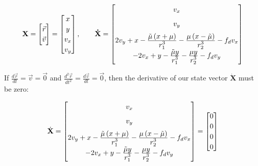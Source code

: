 \documentclass{article}
\newcommand{\deriv}[2]{\frac{d#1}{d#2}}
\newcommand{\ddfrac}[2]{\frac{\displaystyle #1}{\displaystyle #2}}
\begin{document}
\begin{equation*}
    \bf{X}
    = \begin{bmatrix}
        \vec{r} \\
        \vec{v}
    \end{bmatrix}
    = \begin{bmatrix}
        x   \\
        y   \\
        v_x \\
        v_y
    \end{bmatrix},
    \qquad \dot{\bf{X}} =
    \begin{bmatrix}
        v_x                                                                                                                  \\[0.2cm]
        v_y                                                                                                                  \\[0.2cm]
        2v_y + x - \ddfrac{\tilde{\mu} \left(x+\mu\right)}{r_1^3} - \ddfrac{\mu \left(x-\tilde{\mu}\right)}{r_2^3} - f_d v_x \\[0.2cm]
        -2v_x + y - \ddfrac{\tilde{\mu}y}{r_1^3} - \ddfrac{\mu y}{r_2^3} - f_d v_y
    \end{bmatrix}
\end{equation*}

If $\displaystyle \deriv{\vec{r}}{t} = \vec{v} = \vec{0}$ and $\displaystyle \deriv{^2\vec{r}}{t^2} = \deriv{\vec{v}}{t} = \vec{0}$, then the derivative of our state vector $\dot{\textbf{X}}$ must be zero:

\begin{equation*}
    \dot{\bf{X}} =
    \begin{bmatrix}
        v_x                                                                                                                  \\[0.2cm]
        v_y                                                                                                                  \\[0.2cm]
        2v_y + x - \ddfrac{\tilde{\mu} \left(x+\mu\right)}{r_1^3} - \ddfrac{\mu \left(x-\tilde{\mu}\right)}{r_2^3} - f_d v_x \\[0.2cm]
        -2v_x + y - \ddfrac{\tilde{\mu}y}{r_1^3} - \ddfrac{\mu y}{r_2^3} - f_d v_y
    \end{bmatrix}
    =
    {
    \renewcommand{\arraystretch}{1.2} %
    \begin{bmatrix}
        0 \\
        0 \\
        0 \\
        0
    \end{bmatrix}
    }
\end{equation*}
\end{document}
